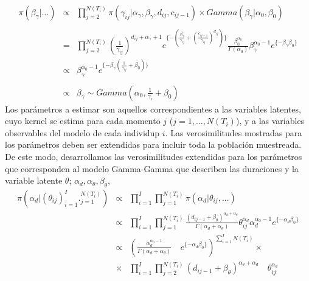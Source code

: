 \\
\begin{eqnarray*}
\pi(\beta_\gamma|...)&\propto&\prod_{j=2}^{N(T_i)} \pi(\gamma_{ij}|\alpha_\gamma,\beta_\gamma,d_{ij},c_{ij-1})\times Gamma(\beta_\gamma|\alpha_0,\beta_0)\\
\\
&=&\prod_{j=2}^{N(T_i)}\left(\frac{1}{\gamma_{ij}}\right)^{d_{ij}+\alpha_\gamma+1}e^{\{-(\frac{\beta_\gamma}{\gamma_{ij}}+(\frac{c_{ij-1}}{\gamma_{ij}})^{d_{ij}})\}}\frac{\beta_0^{\alpha_0}}{\Gamma(\alpha_0)} \beta_\gamma^{\alpha_0-1}e^{\{-\beta_\gamma\beta_0\}}\\
&\propto&\beta_\gamma^{\alpha_0-1}e^{\{-\beta_\gamma(\frac{1}{\gamma_{ij}}+\beta_0)\}}\\
\\
&\propto& \beta_\gamma \sim Gamma(\alpha_0,\frac{1}{\gamma_i}+\beta_0)
\end{eqnarray*}
Los par\'ametros a estimar son aquellos correspondientes a las variables latentes, cuyo kernel se estima para cada momento $j$ ($j=1,...,N(T_i)$), y a las variables observables del modelo de cada individup $i$. Las verosimilitudes mostradas para los par\'ametros deben ser extendidas para incluir toda la poblaci\'on muestreada. De este modo, desarrollamos las verosimilitudes extendidas para los par\'ametros que corresponden al modelo Gamma-Gamma que describen las duraciones y la variable latente $\theta$; $\alpha_d, \alpha_\theta, \beta_\theta$, %
\begin{eqnarray*}
\pi(\alpha_d|(\theta_{ij})_{i=1}^I ._{j=1}^{N(T_i)})&\propto & \prod_{i=1}^I \prod_{j=1}^{N(T_i)} \pi(\alpha_d|\theta_{ij},...)\\
&\propto & \prod_{i=1}^I \prod_{j=1}^{N(T_i)} \frac{(d_{ij-1}+\beta_\theta)^{\alpha_d+\alpha_\theta}}{\Gamma(\alpha_d+\alpha_\theta)} \theta_{ij}^{\alpha_d}\alpha_d^{\alpha_0-1}e^{\{-\alpha_d\beta_0\}}\\
&\propto & \left(\frac{\alpha_d^{\alpha_0 -1}}{\Gamma(\alpha_d+\alpha_\theta)}\quad e^{\{-\alpha_d\beta_0\}}\right)^{\sum_{i=1}^I N(T_i)}  \times \\
&\times & \prod_{i=1}^I \prod_{j=2}^{N(T_i)} (d_{ij-1}+\beta_\theta)^{\alpha_\theta+\alpha_d} \quad \theta_{ij}^{\alpha_d}
\end{eqnarray*}
